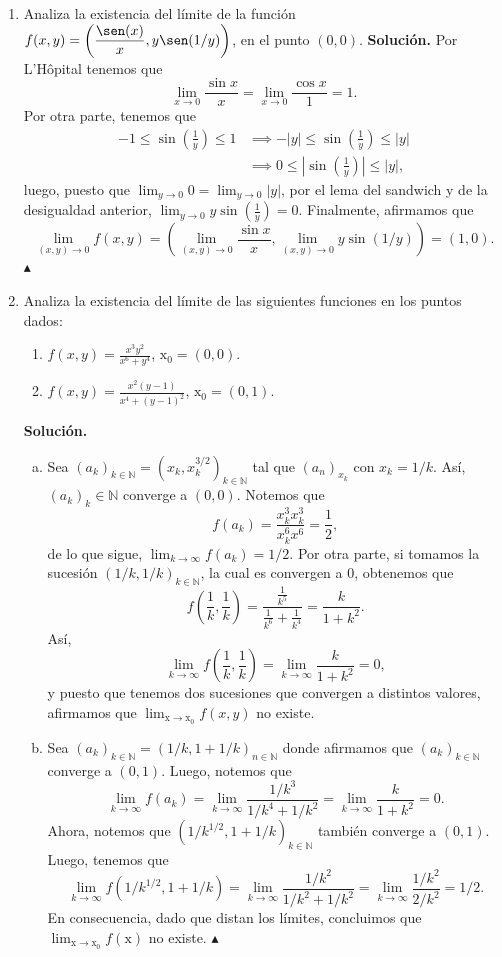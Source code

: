 \documentclass[12pt]{article}
\newcommand{\abs}[1]{\left\vert#1\right\vert}
\newcommand{\N}{\mathbb N}
\newcommand{\x}{\mathrm x}
\begin{document}
\begin{enumerate}
\newpage
\item Analiza la existencia del l\'imite de la función
$\displaystyle{f(x,y) = \left( \frac{\sen(x)}{x},y\sen(1/y) \right)}$, en el punto $(0,0)$.
\textbf{Solución.} Por L'Hôpital tenemos que
\[
\lim_{x\to 0}\frac{\sin x}{x} =\lim_{x\to 0} \frac{\cos x}{1} = 1.
\]
Por otra parte, tenemos que
\begin{align*}
    -1\leq \sin\left(\frac{1}{y}\right) \leq 1 &\implies -\abs{y}\leq \sin\left(\frac{1}{y}\right) \leq \abs{y} \\
    &\implies 0 \leq \abs{\sin\left(\frac{1}{y}\right)} \leq \abs{y},
\end{align*}
luego, puesto que $\lim_{y\to 0}0=\lim_{y\to 0}\abs{y}$, por el lema del sandwich y de la desigualdad anterior, $\lim_{y\to 0}y\sin\left(\frac{1}{y}\right)=0$. Finalmente, afirmamos que
\[
    \lim_{(x,y)\to 0}f(x,y) = \left(\lim_{(x,y)\to 0}\frac{\sin x}{x},\lim_{(x,y)\to 0} y\sin\left(1/y\right)\right) = \left(1,0\right).
\]
\hfill $\blacktriangle$


\item Analiza la existencia del l\'imite de las siguientes funciones en los puntos dados:
\begin{enumerate}[(1)]
\item $\displaystyle{f(x,y) = \frac{x^3y^2}{x^6+y^4}}$, $\x_0=(0,0)$.
\item $\displaystyle{f(x,y) = \frac{x^2(y-1)}{x^4+(y-1)^2}}$, $\x_0=(0,1)$.
\end{enumerate}
\textbf{Solución.}
\begin{enumerate}[(a)]
    \item Sea $(a_k)_{k\in \N}=(x_k,x_k^{3/2})_{k\in\N}$ tal que $(a_n)_{x_k}$ con $x_k=1/k$. Así, $(a_k)_k\in \N$ converge a $(0,0)$. Notemos que
    \[
    f(a_k)=\frac{x_k^3x_k^3}{x_k^6x^6}=\frac{1}{2},
    \]
    de lo que sigue, $\lim_{k\to \infty}f(a_k)=1/2$. Por otra parte, si tomamos la sucesión $(1/k,1/k)_{k\in \N}$, la cual es convergen a 0, obtenemos que
    \[
    f\left(\frac{1}{k},\frac{1}{k}\right) = \frac{\frac{1}{k^5}}{\frac{1}{k^6}+\frac{1}{k^4}} = \frac{k}{1+k^2}.
    \]
    Así,
    \[
    \lim_{k\to \infty}f\left(\frac{1}{k},\frac{1}{k}\right)= \lim_{k\to \infty}\frac{k}{1+k^2} = 0,
    \]
    y puesto que tenemos dos sucesiones que convergen a distintos valores, afirmamos que $\lim_{\x\to \x_0}f(x,y)$ no existe.
    \item Sea $(a_k)_{k\in \N}=(1/k,1+1/k)_{n\in \N}$ donde afirmamos que $(a_k)_{k\in \N}$ converge a $(0,1)$. Luego, notemos que
    \[
    \lim_{k\to \infty}f(a_k) = \lim_{k\to \infty}\frac{1/k^3}{1/k^4+1/k^2} = \lim_{k\to \infty}\frac{k}{1+k^2} = 0.
    \]
    Ahora, notemos que $(1/k^{1/2},1+1/k)_{k\in \N}$ también converge a $(0,1)$. Luego, tenemos que
    \[
    \lim_{k\to \infty}f\left(1/k^{1/2},1+1/k\right) = \lim_{k\to \infty}\frac{1/k^2}{1/k^2+1/k^2} = \lim_{k\to \infty}\frac{1/k^2}{2/k^2} = 1/2.
    \]
    En consecuencia, dado que distan los límites, concluimos que $\lim_{\x \to \x_0}f(\x)$ no existe. \hfill $\blacktriangle$ 
    

\end{enumerate}
\end{enumerate}
\end{document}
